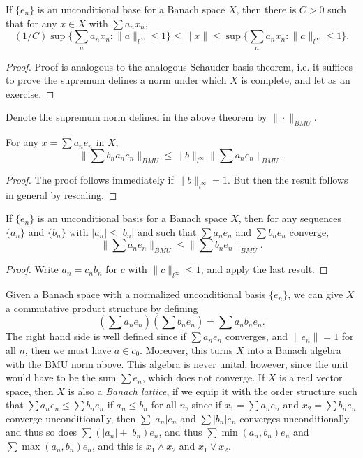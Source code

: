 \begin{theorem}
    If $\{ e_n \}$ is an unconditional base for a Banach space $X$, then there is $C > 0$ such that for any $x \in X$ with $\sum a_n x_n$,
    \[ (1/C) \sup \{ \sum_n a_n x_n : \| a \|_{l^\infty} \leq 1 \} \leq \| x \| \leq \sup \{ \sum_n a_n x_n : \| a \|_{l^\infty} \leq 1 \}. \]
\end{theorem}
\begin{proof}
    Proof is analogous to the analogous Schauder basis theorem, i.e. it suffices to prove the supremum defines a norm under which $X$ is complete, and let as an exercise.
\end{proof}

Denote the supremum norm defined in the above theorem by $\| \cdot \|_{BMU}$.

\begin{lemma}
    For any $x = \sum a_n e_n$ in $X$,
    \[ \| \sum b_n a_n e_n \|_{BMU} \leq \| b \|_{l^\infty} \| \sum a_n e_n \|_{BMU}. \]
\end{lemma}
\begin{proof}
    The proof follows immediately if $\| b \|_{l^\infty} = 1$. But then the result follows in general by rescaling.
\end{proof}

\begin{theorem}
    If $\{ e_n \}$ is an unconditional basis for a Banach space $X$, then for any sequences $\{ a_n \}$ and $\{ b_n \}$ with $|a_n| \leq |b_n|$ and such that $\sum a_n e_n$ and $\sum b_n e_n$ converge,
    \[ \| \sum a_n e_n \|_{BMU} \leq \| \sum b_n e_n \|_{BMU}. \]
\end{theorem}
\begin{proof}
    Write $a_n = c_n b_n$ for $c$ with $\| c \|_{l^\infty} \leq 1$, and apply the last result.
\end{proof}

Given a Banach space with a normalized unconditional basis $\{ e_n \}$, we can give $X$ a commutative product structure by defining
%
\[ \left( \sum a_n e_n \right) \left( \sum b_n e_n \right) = \sum a_n b_n e_n. \]
%
The right hand side is well defined since if $\sum a_n e_n$ converges, and $\| e_n \| = 1$ for all $n$, then we must have $a \in c_0$. Moreover, this turns $X$ into a Banach algebra with the $\text{BMU}$ norm above. This algebra is never unital, however, since the unit would have to be the sum $\sum e_n$, which does not converge. If $X$ is a real vector space, then $X$ is also a \emph{Banach lattice}, if we equip it with the order structure such that $\sum a_n e_n \leq \sum b_n e_n$ if $a_n \leq b_n$ for all $n$, since if $x_1 = \sum a_n e_n$ and $x_2 = \sum b_n e_n$ converge unconditionally, then $\sum |a_n| e_n$ and $\sum |b_n| e_n$ converges unconditionally, and thus so does $\sum (|a_n| + |b_n) e_n$, and thus $\sum \min(a_n,b_n) e_n$ and $\sum \max(a_n,b_n) e_n$, and this is $x_1 \wedge x_2$ and $x_1 \vee x_2$.

